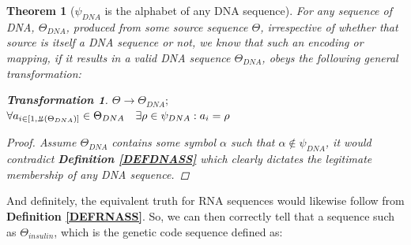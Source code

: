 \documentclass[a4paper, 18pt]{book} %
\newtheorem{theo}{Theorem}
\newtheorem{trans}{Transformation}
\newcommand{\invpi}{\rotatebox[origin=c]{180}{$\pi$}}
\begin{document}
\begin{theo}[$\psi_{DNA}$ is the alphabet of any DNA sequence]
\label{THEODNA}
For any sequence of DNA, $\Theta_{DNA}$, produced from some source sequence $\Theta$, irrespective of whether that source is itself a DNA sequence or not, we know that such an encoding or mapping, if it results in a valid DNA sequence $\Theta_{DNA}$, obeys the following general transformation:\\

\begin{trans}
\label{TRANSmDNA}
$\Theta \rightarrow \Theta_{DNA};$\\
$\forall a_{i \in [1,\invpi(\Theta_{DNA})]} \in \Theta_{DNA} \quad \exists \rho \in \psi_{DNA}: a_i = \rho$
\end{trans}

\begin{proof}
Assume $\Theta_{DNA}$ contains some symbol $\alpha$ such that $\alpha \not\in \psi_{DNA}$, it would contradict \textbf{Definition \ref{DEFDNASS}} which clearly dictates the legitimate membership of any DNA sequence.
\end{proof}

\end{theo}


And definitely, the equivalent truth for RNA sequences would likewise follow from \textbf{Definition \ref{DEFRNASS}}. So, we can then correctly tell that a sequence such as $\Theta_{insulin}$, which is the genetic code sequence defined as:\\


\\
\end{document}

